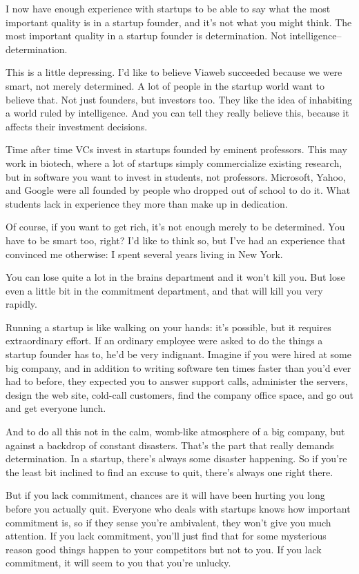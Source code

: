 \documentclass[12pt]{book}
\begin{document}
I now have enough experience with startups to be able to say what the
most important quality is in a startup founder, and it's not what you
might think. The most important quality in a startup founder is
determination. Not intelligence-- determination.

This is a little depressing. I'd like to believe Viaweb succeeded
because we were smart, not merely determined. A lot of people in the
startup world want to believe that. Not just founders, but investors
too. They like the idea of inhabiting a world ruled by intelligence. And
you can tell they really believe this, because it affects their
investment decisions.

Time after time VCs invest in startups founded by eminent professors.
This may work in biotech, where a lot of startups simply commercialize
existing research, but in software you want to invest in students, not
professors. Microsoft, Yahoo, and Google were all founded by people who
dropped out of school to do it. What students lack in experience they
more than make up in dedication.

Of course, if you want to get rich, it's not enough merely to be
determined. You have to be smart too, right? I'd like to think so, but
I've had an experience that convinced me otherwise: I spent several
years living in New York.

You can lose quite a lot in the brains department and it won't kill you.
But lose even a little bit in the commitment department, and that will
kill you very rapidly.

Running a startup is like walking on your hands: it's possible, but it
requires extraordinary effort. If an ordinary employee were asked to do
the things a startup founder has to, he'd be very indignant. Imagine if
you were hired at some big company, and in addition to writing software
ten times faster than you'd ever had to before, they expected you to
answer support calls, administer the servers, design the web site,
cold-call customers, find the company office space, and go out and get
everyone lunch.

And to do all this not in the calm, womb-like atmosphere of a big
company, but against a backdrop of constant disasters. That's the part
that really demands determination. In a startup, there's always some
disaster happening. So if you're the least bit inclined to find an
excuse to quit, there's always one right there.

But if you lack commitment, chances are it will have been hurting you
long before you actually quit. Everyone who deals with startups knows
how important commitment is, so if they sense you're ambivalent, they
won't give you much attention. If you lack commitment, you'll just find
that for some mysterious reason good things happen to your competitors
but not to you. If you lack commitment, it will seem to you that you're
unlucky.
\end{document}

